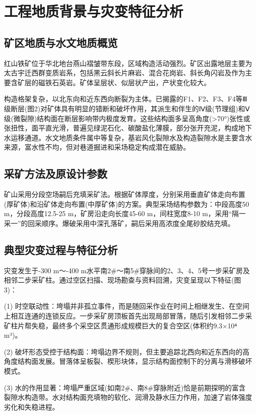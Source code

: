 \documentclass[twocolumn,a4paper,10pt]{article}
\begin{document}
\section{工程地质背景与灾变特征分析}
\subsection{矿区地质与水文地质概览}
红山铁矿位于华北地台燕山褶皱带东段，区域构造活动强烈。矿区出露地层主要为太古宇迁西群变质岩系，包括黑云斜长片麻岩、混合花岗岩、斜长角闪岩及作为主要含矿层的磁铁石英岩\cite{8}。矿体呈层状、似层状产出，产状变化较大。

构造格架复杂，以北东向和近东西向断裂为主体。已揭露的F1、F2、F3、F4等Ⅲ级断层(图2)对矿体具有明显的错断和破坏作用，其派生和伴生的Ⅳ级(节理组)和Ⅴ级(微裂隙)结构面在断层影响带内极度发育。这些结构面多呈高角度(>70°)张性或张扭性，面平直光滑，普遍见绿泥石化、碳酸盐化薄膜，部分张开充泥，构成地下水运移通道。水文地质条件属中等复杂，基岩风化裂隙水及构造裂隙水是主要含水来源，富水性不均，但对巷道掘进和采场稳定构成潜在威胁。

\subsection{采矿方法及原设计参数}
矿山采用分段空场嗣后充填采矿法。根据矿体厚度，分别采用垂直矿体走向布置(厚矿体)和沿矿体走向布置(中厚矿体)的方案。典型采场结构参数为：中段高度50 m，分段高度12.5-25 m，矿房沿走向长度45-60 m，间柱宽度8-10 m，采用“隔一采一”的回采顺序。爆破采用中深孔落矿，嗣后采用高浓度全尾砂胶结充填。

\subsection{典型灾变过程与特征分析}
灾变发生于-300 m～-400 m水平南2#～南5#穿脉间的2、3、4、5号一步采矿房及相邻二步采矿柱。通过空区扫描、现场勘查与资料回溯，灾变呈现以下特征(图3)：

(1) 时空联动性：垮塌并非孤立事件，而是随回采作业在时间上相继发生、在空间上相互连通的连锁反应。一步采矿房顶板首先出现局部冒落，随后引发相邻二步采矿柱片帮失稳，最终多个采空区贯通形成规模巨大的复合空区(体积约9.3×10⁴ m³)。

(2) 破坏形态受控于结构面：垮塌边界不规则，但主要追踪北西向和近东西向的高角度结构面发展。冒落体呈板裂、楔形块体，显示结构面控制下的分离与滑移破坏模式。

(3) 水的作用显著：垮塌严重区域(如南2#、南8#穿脉附近)恰是前期探明的富含裂隙水构造带。水对结构面充填物的软化、润滑及静水压力作用，加速了岩体强度劣化和失稳进程。
\end{document}

